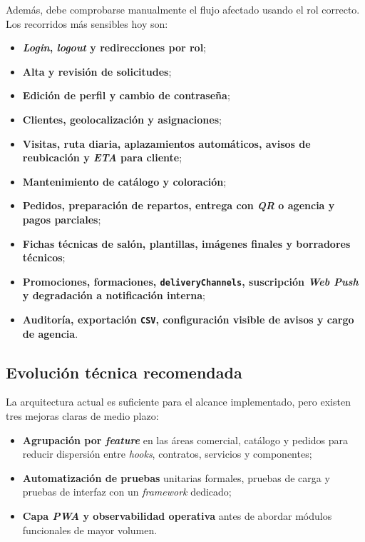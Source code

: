 Además, debe comprobarse manualmente el flujo afectado usando el rol correcto. Los recorridos más sensibles hoy son:

\begin{itemize}
    \item \textbf{\textit{Login}, \textit{logout} y redirecciones por rol};
    \item \textbf{Alta y revisión de solicitudes};
    \item \textbf{Edición de perfil y cambio de contraseña};
    \item \textbf{Clientes, geolocalización y asignaciones};
    \item \textbf{Visitas, ruta diaria, aplazamientos automáticos, avisos de reubicación y \textit{ETA} para cliente};
    \item \textbf{Mantenimiento de catálogo y coloración};
    \item \textbf{Pedidos, preparación de repartos, entrega con \textit{QR} o agencia y pagos parciales};
    \item \textbf{Fichas técnicas de salón, plantillas, imágenes finales y borradores técnicos};
    \item \textbf{Promociones, formaciones, \texttt{deliveryChannels}, suscripción \textit{Web Push} y degradación a notificación interna};
    \item \textbf{Auditoría, exportación \texttt{CSV}, configuración visible de avisos y cargo de agencia}.
\end{itemize}

\subsection{Evolución técnica recomendada}

La arquitectura actual es suficiente para el alcance implementado, pero existen tres mejoras claras de medio plazo:

\begin{itemize}
    \item \textbf{Agrupación por \textit{feature}} en las áreas comercial, catálogo y pedidos para reducir dispersión entre \textit{hooks}, contratos, servicios y componentes;
    \item \textbf{Automatización de pruebas} unitarias formales, pruebas de carga y pruebas de interfaz con un \textit{framework} dedicado;
    \item \textbf{Capa \textit{PWA} y observabilidad operativa} antes de abordar módulos funcionales de mayor volumen.
\end{itemize}

